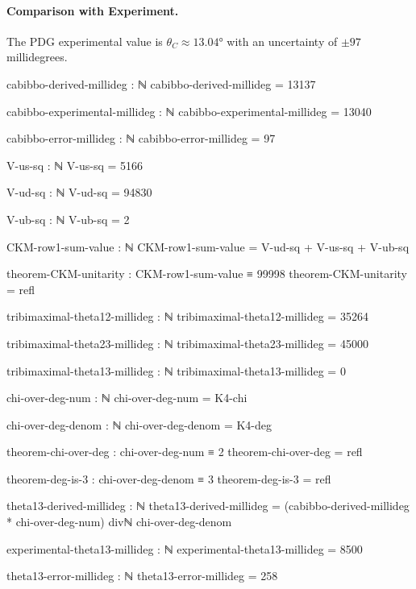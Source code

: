 \documentclass[11pt,a4paper]{book}
\begin{document}
\paragraph{Comparison with Experiment.}
The PDG experimental value is $\theta_C \approx 13.04°$ with an uncertainty of $\pm 97$ millidegrees.

\begin{code}
cabibbo-derived-millideg : ℕ
cabibbo-derived-millideg = 13137

cabibbo-experimental-millideg : ℕ
cabibbo-experimental-millideg = 13040

cabibbo-error-millideg : ℕ
cabibbo-error-millideg = 97
\end{code}

\begin{code}
V-us-sq : ℕ
V-us-sq = 5166
\end{code}

\begin{code}
V-ud-sq : ℕ
V-ud-sq = 94830
\end{code}

\begin{code}
V-ub-sq : ℕ
V-ub-sq = 2

CKM-row1-sum-value : ℕ
CKM-row1-sum-value = V-ud-sq + V-us-sq + V-ub-sq

theorem-CKM-unitarity : CKM-row1-sum-value ≡ 99998
theorem-CKM-unitarity = refl
\end{code}

\begin{code}
tribimaximal-theta12-millideg : ℕ
tribimaximal-theta12-millideg = 35264

tribimaximal-theta23-millideg : ℕ
tribimaximal-theta23-millideg = 45000

tribimaximal-theta13-millideg : ℕ
tribimaximal-theta13-millideg = 0
\end{code}

\begin{code}
chi-over-deg-num : ℕ
chi-over-deg-num = K4-chi

chi-over-deg-denom : ℕ
chi-over-deg-denom = K4-deg

theorem-chi-over-deg : chi-over-deg-num ≡ 2
theorem-chi-over-deg = refl

theorem-deg-is-3 : chi-over-deg-denom ≡ 3
theorem-deg-is-3 = refl

theta13-derived-millideg : ℕ
theta13-derived-millideg = (cabibbo-derived-millideg * chi-over-deg-num) divℕ chi-over-deg-denom

experimental-theta13-millideg : ℕ
experimental-theta13-millideg = 8500

theta13-error-millideg : ℕ
theta13-error-millideg = 258
\end{code}
\end{document}

